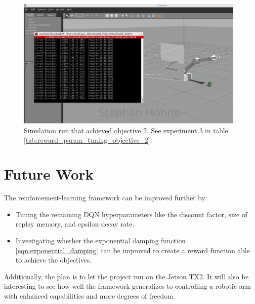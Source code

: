 \documentclass[11pt, onecolumn, oneside, reqno]{amsart}
\begin{document}
\begin{figure}[htpb]
      \centering
      \includegraphics[width=\linewidth]{images/228_signed.PNG}
      \caption{Simulation run that achieved objective 2. See experiment 3 in table \ref{tab:reward_param_tuning_objective_2}.}
      \label{fig:objective_2_achieved}
\end{figure}

\section{Future Work}
The reinforcement-learning framework can be improved further by:
\begin{itemize}
\item Tuning the remaining DQN hyperparameters like the discount factor, size of replay memory, and epsilon decay rate.
\item Investigating whether the exponential damping function \ref{eqn:exponential_damping} can be improved to create a reward function able to achieve the objectives. 
\end{itemize}

Additionally, the plan is to let the project run on the Jetson TX2. It will also be interesting to see how well the framework generalizes to controlling a robotic arm with enhanced capabilities and more degrees of freedom.
\end{document}
